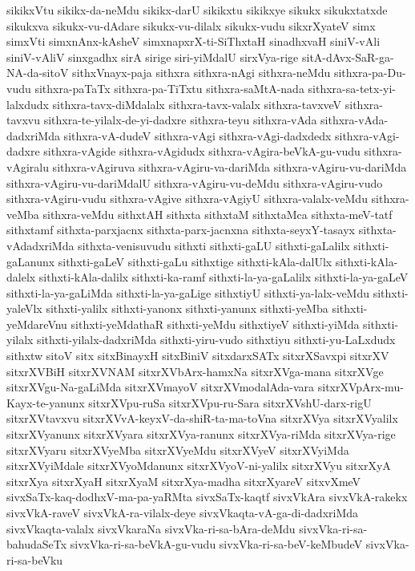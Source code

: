 {sikikxVtu
sikikx-da-neMdu
sikikx-darU
sikikxtu
sikikxye
sikukx
sikukxtatxde
sikukxva
sikukx-vu-dAdare
sikukx-vu-dilalx
sikukx-vudu
sikxrXyateV
simx
simxVti
simxnAnx-kAsheV
simxnapxrX-ti-SiThxtaH
sinadhxvaH
siniV-vAli
siniV-vAliV
sinxgadhx
sirA
sirige
siri-yiMdalU
sirxVya-rige
sitA-dAvx-SaR-ga-NA-da-sitoV
sithxVnayx-paja
sithxra
sithxra-nAgi
sithxra-neMdu
sithxra-pa-Du-vudu
sithxra-paTaTx
sithxra-pa-TiTxtu
sithxra-saMtA-nada
sithxra-sa-tetx-yi-lalxdudx
sithxra-tavx-diMdalalx
sithxra-tavx-valalx
sithxra-tavxveV
sithxra-tavxvu
sithxra-te-yilalx-de-yi-dadxre
sithxra-teyu
sithxra-vAda
sithxra-vAda-dadxriMda
sithxra-vA-dudeV
sithxra-vAgi
sithxra-vAgi-dadxdedx
sithxra-vAgi-dadxre
sithxra-vAgide
sithxra-vAgidudx
sithxra-vAgira-beVkA-gu-vudu
sithxra-vAgiralu
sithxra-vAgiruva
sithxra-vAgiru-va-dariMda
sithxra-vAgiru-vu-dariMda
sithxra-vAgiru-vu-dariMdalU
sithxra-vAgiru-vu-deMdu
sithxra-vAgiru-vudo
sithxra-vAgiru-vudu
sithxra-vAgive
sithxra-vAgiyU
sithxra-valalx-veMdu
sithxra-veMba
sithxra-veMdu
sithxtAH
sithxta
sithxtaM
sithxtaMca
sithxta-meV-tatf
sithxtamf
sithxta-parxjacnx
sithxta-parx-jacnxna
sithxta-seyxY-tasayx
sithxta-vAdadxriMda
sithxta-venisuvudu
sithxti
sithxti-gaLU
sithxti-gaLalilx
sithxti-gaLanunx
sithxti-gaLeV
sithxti-gaLu
sithxtige
sithxti-kAla-dalUlx
sithxti-kAla-dalelx
sithxti-kAla-dalilx
sithxti-ka-ramf
sithxti-la-ya-gaLalilx
sithxti-la-ya-gaLeV
sithxti-la-ya-gaLiMda
sithxti-la-ya-gaLige
sithxtiyU
sithxti-ya-lalx-veMdu
sithxti-yaleVlx
sithxti-yalilx
sithxti-yanonx
sithxti-yanunx
sithxti-yeMba
sithxti-yeMdareVnu
sithxti-yeMdathaR
sithxti-yeMdu
sithxtiyeV
sithxti-yiMda
sithxti-yilalx
sithxti-yilalx-dadxriMda
sithxti-yiru-vudo
sithxtiyu
sithxti-yu-LaLxdudx
sithxtw
sitoV
sitx
sitxBinayxH
sitxBiniV
sitxdarxSATx
sitxrXSavxpi
sitxrXV
sitxrXVBiH
sitxrXVNAM
sitxrXVbArx-hamxNa
sitxrXVga-mana
sitxrXVge
sitxrXVgu-Na-gaLiMda
sitxrXVmayoV
sitxrXVmodalAda-vara
sitxrXVpArx-mu-Kayx-te-yanunx
sitxrXVpu-ruSa
sitxrXVpu-ru-Sara
sitxrXVshU-darx-rigU
sitxrXVtavxvu
sitxrXVvA-keyxV-da-shiR-ta-ma-toVna
sitxrXVya
sitxrXVyalilx
sitxrXVyanunx
sitxrXVyara
sitxrXVya-ranunx
sitxrXVya-riMda
sitxrXVya-rige
sitxrXVyaru
sitxrXVyeMba
sitxrXVyeMdu
sitxrXVyeV
sitxrXVyiMda
sitxrXVyiMdale
sitxrXVyoMdanunx
sitxrXVyoV-ni-yalilx
sitxrXVyu
sitxrXyA
sitxrXya
sitxrXyaH
sitxrXyaM
sitxrXya-madha
sitxrXyareV
sitxvXmeV
sivxSaTx-kaq-dodhxV-ma-pa-yaRMta
sivxSaTx-kaqtf
sivxVkAra
sivxVkA-rakekx
sivxVkA-raveV
sivxVkA-ra-vilalx-deye
sivxVkaqta-vA-ga-di-dadxriMda
sivxVkaqta-valalx
sivxVkaraNa
sivxVka-ri-sa-bAra-deMdu
sivxVka-ri-sa-bahudaSeTx
sivxVka-ri-sa-beVkA-gu-vudu
sivxVka-ri-sa-beV-keMbudeV
sivxVka-ri-sa-beVku
}
